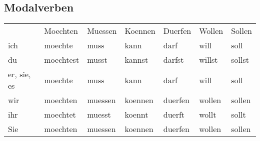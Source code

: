 \documentclass[a4paper,10pt]{article}
\begin{document}
\begin{appendix}
 
 \section{Modalverben}
 
 \begin{tabular}{l l l l l l l}
  & Moechten & Muessen & Koennen & Duerfen & Wollen & Sollen \\
  ich & moechte & muss & kann & darf & will & soll \\
  du & moechtest & musst & kannst & darfst & willst & sollst \\
  er, sie, es & moechte & muss & kann & darf & will & soll \\
  wir & moechten & muessen & koennen & duerfen & wollen & sollen \\
  ihr & moechtet & muesst & koennt & duerft & wollt & sollt \\
  Sie & moechten & muessen & koennen & duerfen & wollen & sollen \\
 \end{tabular}

 
 
\end{appendix}

\printglossaries
\end{document}
